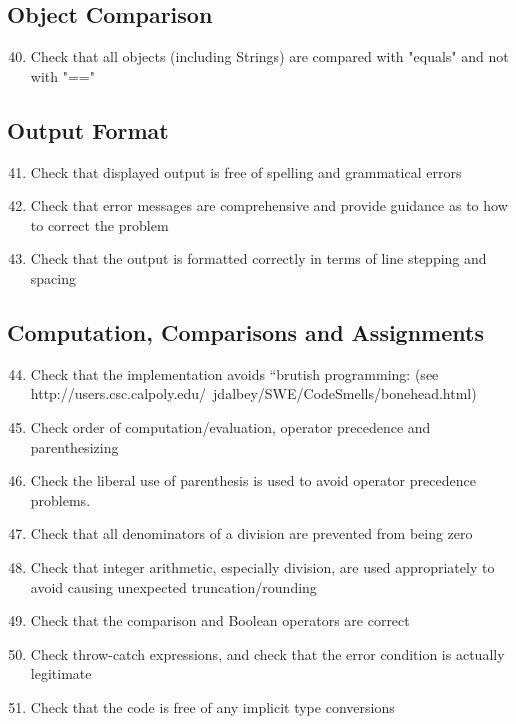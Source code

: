 	\subsection{Object Comparison}
	\begin{enumerate}
		\setcounter{enumi}{39}
		\item Check that all objects (including Strings) are compared with "equals" and not with "=="
	\end{enumerate}
	\subsection{Output Format}
	\begin{enumerate}
		\setcounter{enumi}{40}
		\item Check that displayed output is free of spelling and grammatical errors
		\item Check that error messages are comprehensive and provide guidance as to how to correct the problem
		\item Check that the output is formatted correctly in terms of line stepping and spacing
	\end{enumerate}
	\subsection{Computation, Comparisons and Assignments}
	\begin{enumerate}
		\setcounter{enumi}{43}
		\item Check that the implementation avoids “brutish programming: (see http://users.csc.calpoly.edu/~jdalbey/SWE/CodeSmells/bonehead.html)
		\item Check order of computation/evaluation, operator precedence and parenthesizing
		\item Check the liberal use of parenthesis is used to avoid operator precedence problems.
		\item Check that all denominators of a division are prevented from being zero
		\item Check that integer arithmetic, especially division, are used appropriately to avoid causing unexpected truncation/rounding
		\item Check that the comparison and Boolean operators are correct
		\item Check throw-catch expressions, and check that the error condition is actually legitimate
		\item Check that the code is free of any implicit type conversions
	\end{enumerate}
